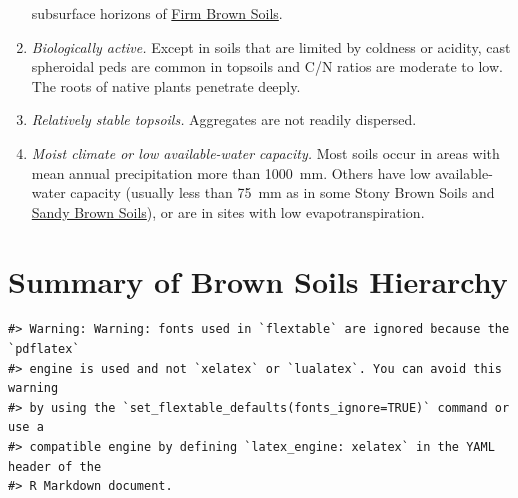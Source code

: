 \documentclass[
  letterpaper,
  DIV=11,
  numbers=noendperiod]{scrreprt}
\begin{document}
\begin{enumerate}
  subsurface horizons of \protect\hyperlink{sec-BF}{Firm Brown Soils}.
\item
  \emph{Biologically active.} Except in soils that are limited by
  coldness or acidity, cast spheroidal peds are common in topsoils and
  C/N ratios are moderate to low. The roots of native plants penetrate
  deeply.
\item
  \emph{Relatively stable topsoils.} Aggregates are not readily
  dispersed.
\item
  \emph{Moist climate or low available-water capacity.} Most soils occur
  in areas with mean annual precipitation more than 1000~mm. Others have
  low available-water capacity (usually less than 75~mm as in some Stony
  Brown Soils and \protect\hyperlink{sec-BS}{Sandy Brown Soils}), or are
  in sites with low evapotranspiration.
\end{enumerate}

\hypertarget{sec-sum-B}{%
\section{Summary of Brown Soils Hierarchy}\label{sec-sum-B}}

\begin{verbatim}
#> Warning: Warning: fonts used in `flextable` are ignored because the `pdflatex`
#> engine is used and not `xelatex` or `lualatex`. You can avoid this warning
#> by using the `set_flextable_defaults(fonts_ignore=TRUE)` command or use a
#> compatible engine by defining `latex_engine: xelatex` in the YAML header of the
#> R Markdown document.
\end{verbatim}

\providecommand{\docline}[3]{\noalign{\global\setlength{\arrayrulewidth}{#1}}\arrayrulecolor[HTML]{#2}\cline{#3}}

\setlength{\tabcolsep}{2pt}

\renewcommand*{\arraystretch}{1.5}
\end{document}
